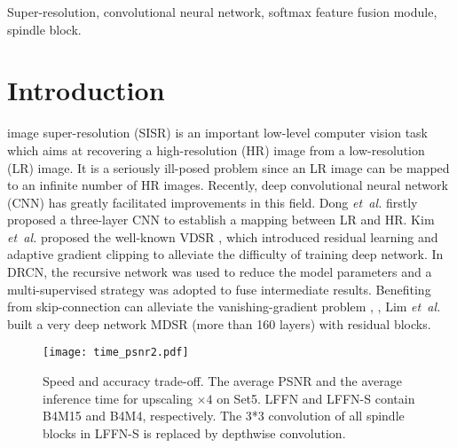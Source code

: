 \documentclass[journal]{IEEEtran}
\begin{document}
\begin{IEEEkeywords}
Super-resolution, convolutional neural network, softmax feature fusion module, spindle block.
\end{IEEEkeywords}






\IEEEpeerreviewmaketitle



\section{Introduction}
 image super-resolution (SISR) is an important low-level computer vision task which aims at recovering a high-resolution (HR) image from a low-resolution (LR) image. It is a seriously ill-posed problem since an LR image can be mapped to an infinite number of HR images. Recently, deep convolutional neural network (CNN) has greatly facilitated improvements in this field. Dong \emph{et~al.} \cite{dong2014learning} firstly proposed a three-layer CNN to establish a mapping between LR and HR. Kim \emph{et~al.} proposed the well-known VDSR \cite{Kim2016Accurate}, which introduced residual learning and adaptive gradient clipping to alleviate the difficulty of training deep network. In DRCN\cite{kim2016deeply}, the recursive network was used to reduce the model parameters and a multi-supervised strategy was adopted to fuse intermediate results. Benefiting from skip-connection can alleviate the vanishing-gradient problem \cite{he2016deep}, \cite{chu2018novel}, Lim \emph{et~al.} \cite{lim2017enhanced} built a very deep network MDSR (more than 160 layers) with residual blocks. 

\begin{figure}[ht]
\centering
\texttt{[image: time\_psnr2.pdf]}
\caption{Speed and accuracy trade-off. The average PSNR and the average inference time for upscaling $\times 4$ on Set5. LFFN and LFFN-S contain B4M15 and B4M4, respectively. The 3*3 convolution of all spindle blocks in LFFN-S is replaced by depthwise convolution.}
\label{fig:trade_off_time_psnr}
\end{figure}
\end{document}
